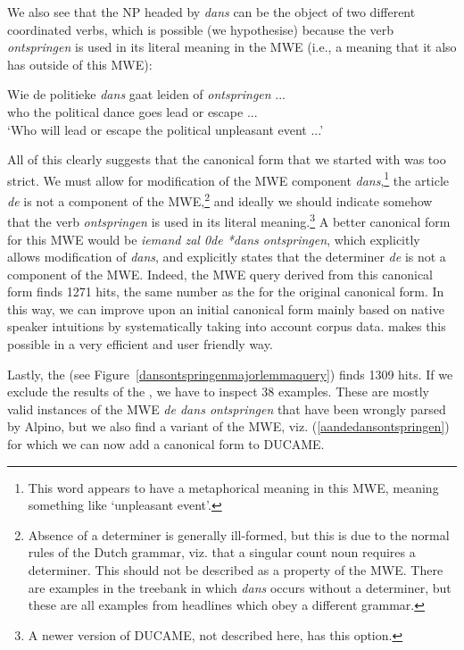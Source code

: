 \documentclass[output=paper,colorlinks,citecolor=brown]{langscibook}
\begin{document}
We also see that the NP headed by \textit{dans} can be the object of two different coordinated verbs, which is possible (we hypothesise) because the verb \textit{ontspringen} is used in its  literal meaning in the MWE (i.e., a meaning that it also has outside of this MWE):

\begin{exe}
    \ex \gll Wie de politieke \textit{dans} gaat leiden of \textit{ontspringen} ...\\
    who the political dance goes lead or escape ...\\
    \glt `Who will lead or escape the political unpleasant event ...' 
\end{exe}

All of this clearly suggests that the canonical form that we started with was too strict. We must allow for modification of the MWE component \textit{dans},\footnote{This word appears to have a metaphorical meaning in this MWE, meaning something like `unpleasant event'.} the article \textit{de} is not a component of the MWE,\footnote{Absence of a determiner is generally ill-formed, but this is due to the normal rules of the Dutch grammar, viz. that a singular count noun requires a determiner. This should not be described as a property of the MWE. There are examples in the treebank in which \textit{dans} occurs without a determiner, but these are all examples from headlines which obey a different grammar.} and ideally  we should indicate somehow that  the verb \textit{ontspringen} is used in its literal meaning.\footnote{A newer version of DUCAME, not described here, has this option.}  A better canonical form for this MWE would be \textit{iemand zal 0de *dans ontspringen}, which explicitly allows modification of \textit{dans}, and explicitly states that the determiner \textit{de} is not a component of the MWE.  Indeed, the MWE query derived from this canonical form  finds 1271 hits, the same number as the {\nearmissquery} for the original canonical form. In this way, we can improve upon an initial canonical form mainly based on native speaker intuitions by systematically taking into account corpus data. {\mwefinder} makes this possible in a very efficient and user friendly way.

Lastly, the {\supersetquery} (see Figure~\ref{dansontspringenmajorlemmaquery}) finds 1309 hits. If we exclude the results of the {\nearmissquery}, we have to inspect 38 examples. These are mostly valid instances of the MWE \textit{de dans ontspringen} that have been wrongly parsed by Alpino, but we also find a variant of the MWE, viz. (\ref{aandedansontspringen}) for which we can now add a canonical form to DUCAME.
\end{document}

